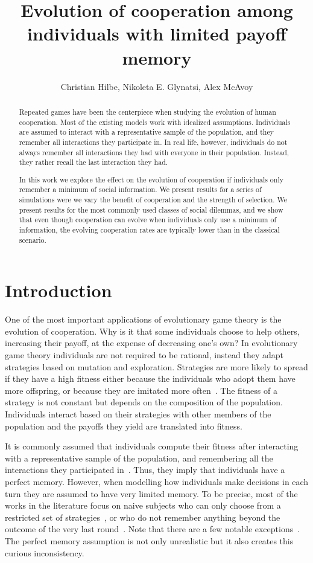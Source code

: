 \documentclass[11pt]{article}
\title{
\bf  \sffamily \LARGE Evolution of cooperation among individuals with limited payoff memory\\}
\date{}
\author{Christian Hilbe, Nikoleta E. Glynatsi, Alex McAvoy}
\theoremstyle{plainCl1}
\theoremstyle{plainCl2}
\begin{document}
\maketitle

\begin{abstract}
Repeated games have been the centerpiece when studying the evolution of human
cooperation. Most of the existing models work with idealized assumptions.
Individuals are assumed to interact with a representative sample of the
population, and they remember all interactions they participate in. In real
life, however, individuals do not always remember all interactions they had with
everyone in their population. Instead, they rather recall the last interaction
they had.

In this work we explore the effect on the evolution of cooperation if
individuals only remember a minimum of social information. We present results
for a series of simulations were we vary the benefit of cooperation and the
strength of selection. We present results for the most commonly used classes of
social dilemmas, and we show that even though cooperation can evolve when
individuals only use a minimum of information, the evolving cooperation rates
are typically lower than in the classical scenario.
\end{abstract}

\section{Introduction}

One of the most important applications of evolutionary game theory is the
evolution of cooperation. Why is it that some individuals choose to help others,
increasing their payoff, at the expense of decreasing one’s own? In evolutionary
game theory individuals are not required to be rational, instead they adapt
strategies based on mutation and exploration. Strategies are more likely to
spread if they have a high fitness either because the individuals who adopt them
have more offspring, or because they are imitated more often~\cite{Wu2015}. The
fitness of a strategy is not constant but depends on the composition of the
population. Individuals interact based on their strategies with other members of
the population and the payoffs they yield are translated into fitness.

It is commonly assumed that individuals compute their fitness after interacting
with a representative sample of the population, and remembering all the
interactions they participated in~\cite{Nowak2006}. Thus, they imply that
individuals have a perfect memory. However, when modelling how individuals make
decisions in each turn they are assumed to have very limited memory. To be
precise, most of the works in the literature focus on naive subjects who can
only choose from a restricted set of strategies~\cite{Nowak1992tit}, or who do
not remember anything beyond the outcome of the very last round~\cite{Baek2016}.
Note that there are a few notable exceptions~\cite{Hauert1997, Stewart2016}.
The perfect memory assumption is not only unrealistic but it also creates
this curious inconsistency.
\end{document}
